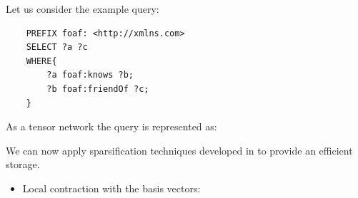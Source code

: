 \begin{example}
    Let us consider the example query:
    \begin{verbatim}
    PREFIX foaf: <http://xmlns.com>
    SELECT ?a ?c
    WHERE{
        ?a foaf:knows ?b;
        ?b foaf:friendOf ?c;
    }
    \end{verbatim}

    As a tensor network the query is represented as:


    We can now apply sparsification techniques developed in  to provide an efficient storage.
    \begin{itemize}
        \item Local contraction with the basis vectors:
\end{itemize}
\end{example}

